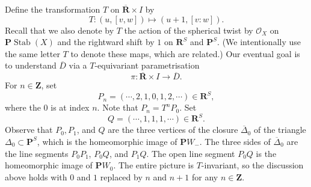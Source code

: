 \documentclass{amsart}
\begin{document}
Define the transformation \(T\) on \(\overline{\mathbf{R}} \times I\) by
\[ T \colon (u,[v,w]) \mapsto (u+1,[v:w]).\]
Recall that we also denote by \(T\) the action of the spherical twist by \(\mathcal{O}_X\) on \(\mathbf{P} \operatorname{Stab}(X)\) and the rightward shift by \(1\) on \(\mathbf{R}^S\) and \(\mathbf{P}^S\).
(We intentionally use the same letter \(T\) to denote these maps, which are related.)
Our eventual goal is to understand \(\overline D\) via a \(T\)-equivariant parametrisation
\[ \pi \colon \overline{\mathbf{R}} \times I \to \overline D.\]
For \(n \in \mathbf{Z}\), set
\[ P_n = (\cdots , 2 , 1,  0 , 1 , 2 , \cdots) \in \mathbf{R}^S,\]
where the \(0\) is at index \(n\).
Note that \(P_n = T^nP_0\).
Set
\[ Q = (\cdots , 1, 1, 1, \cdots ) \in \mathbf{R}^S.\]
Observe that \(P_{0}, P_{1}\), and \(Q\) are the three vertices of the closure \(\overline{\Delta}_0\) of the triangle \(\Delta_0 \subset \mathbf{P}^S\), which is the homeomorphic image of \(\mathbf{P}W_-\).
The three sides of  \(\overline{\Delta}_0\) are the line segments \(P_{0}P_1\), \(P_{0}Q\), and \(P_1 Q\).
The open line segment \(P_0Q\) is the homeomorphic image of \(\mathbf{P}W_0\).
The entire picture is \(T\)-invariant, so the discussion above holds with \(0\) and \(1\) replaced by \(n\) and \(n+1\) for any \(n \in \mathbf{Z}\).
\end{document}
